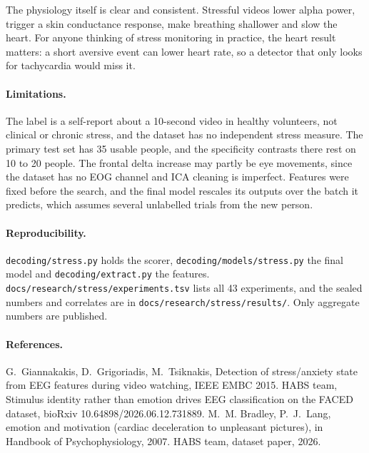 \documentclass[10pt]{article}
\begin{document}
The physiology itself is clear and consistent. Stressful videos lower alpha
power, trigger a skin conductance response, make breathing shallower and slow
the heart. For anyone thinking of stress monitoring in practice, the heart
result matters: a short aversive event can lower heart rate, so a detector
that only looks for tachycardia would miss it.

\paragraph{Limitations.} The label is a self-report about a 10-second video in
healthy volunteers, not clinical or chronic stress, and the dataset has no
independent stress measure. The primary test set has 35 usable people, and the
specificity contrasts there rest on 10 to 20 people. The frontal delta
increase may partly be eye movements, since the dataset has no EOG channel and
ICA cleaning is imperfect. Features were fixed before the search, and the final
model rescales its outputs over the batch it predicts, which assumes several
unlabelled trials from the new person.

\paragraph{Reproducibility.} \texttt{decoding/stress.py} holds the scorer,
\texttt{decoding/models/stress.py} the final model and
\texttt{decoding/extract.py} the features.
\nolinkurl{docs/research/stress/experiments.tsv} lists all 43 experiments, and
the sealed numbers and correlates are in \nolinkurl{docs/research/stress/results/}.
Only aggregate numbers are published.

\paragraph{References.} G.~Giannakakis, D.~Grigoriadis, M.~Tsiknakis,
Detection of stress/anxiety state from EEG features during video watching,
IEEE EMBC 2015. HABS team, Stimulus identity rather than emotion drives EEG
classification on the FACED dataset, bioRxiv 10.64898/2026.06.12.731889. M.~M.
Bradley, P.~J.~Lang, emotion and motivation (cardiac deceleration to
unpleasant pictures), in Handbook of Psychophysiology, 2007. HABS team, dataset
paper, 2026.
\end{document}
